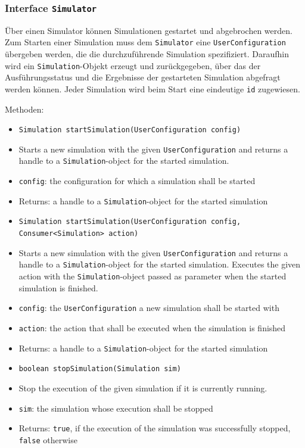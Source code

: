 \documentclass[parskip=full,11pt]{scrartcl}
\begin{document}
\subsubsection{Interface \texttt{Simulator}}
Über einen Simulator können Simulationen gestartet und abgebrochen werden. Zum Starten einer Simulation muss dem \texttt{Simulator} eine \texttt{UserConfiguration} übergeben werden, die die durchzuführende Simulation spezifiziert. Daraufhin wird ein \texttt{Simulation}-Objekt erzeugt und zurückgegeben, über das der Ausführungsstatus und die Ergebnisse der gestarteten Simulation abgefragt werden können. Jeder Simulation wird beim Start eine eindeutige \texttt{id} zugewiesen.

Methoden:
\begin{itemize} \itemsep -10pt
\item \texttt{Simulation startSimulation(UserConfiguration config)}
\item[] Starts a new simulation with the given \texttt{UserConfiguration} and returns a handle to a \texttt{Simulation}-object for the started simulation.
\item[]\texttt{config}: the configuration for which a simulation shall be started
\item[] Returns: a handle to a \texttt{Simulation}-object for the started simulation

\item \texttt{Simulation startSimulation(UserConfiguration config, Consumer<Simulation> action)}
\item[] Starts a new simulation with the given \texttt{UserConfiguration} and returns a handle to a \texttt{Simulation}-object for the started simulation. Executes the given action with the \texttt{Simulation}-object passed as parameter when the started simulation is finished.
\item[] \texttt{config}: the \texttt{UserConfiguration} a new simulation shall be started with
\item[] \texttt{action}: the action that shall be executed when the simulation is finished
\item[] Returns: a handle to a \texttt{Simulation}-object for the started simulation

\item \texttt{boolean stopSimulation(Simulation sim)}
\item[] Stop the execution of the given simulation if it is currently running.
\item[] \texttt{sim}: the simulation whose execution shall be stopped
\item[] Returns: \texttt{true}, if the execution of the simulation was successfully stopped, \texttt{false} otherwise


\end{itemize}
\end{document}
